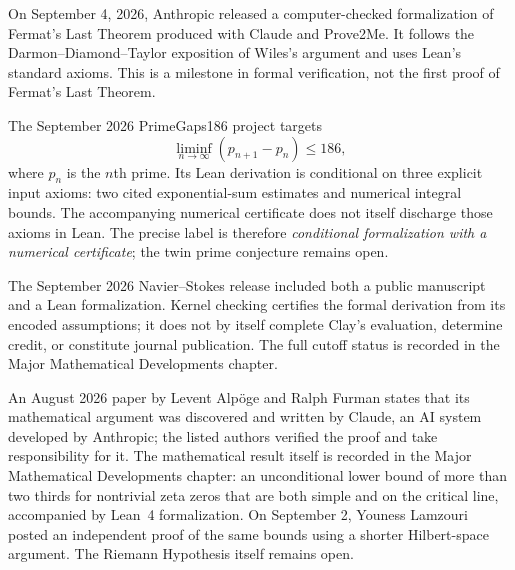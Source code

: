     \begin{fact}
        On September 4, 2026, Anthropic released a computer-checked
        formalization of Fermat's Last Theorem produced with Claude and
        Prove2Me. It follows the Darmon--Diamond--Taylor exposition of Wiles's
        argument and uses Lean's standard axioms. This is a milestone in
        formal verification, not the first proof of Fermat's Last Theorem.
    \end{fact}

    \begin{fact}
        The September 2026 PrimeGaps186 project targets
        \[
            \liminf_{n\to\infty}(p_{n+1}-p_n)\leq186,
        \]
        where $p_n$ is the $n$th prime. Its Lean derivation is conditional on
        three explicit input axioms: two cited exponential-sum estimates and
        numerical integral bounds. The accompanying numerical certificate
        does not itself discharge those axioms in Lean. The precise label is
        therefore \emph{conditional formalization with a numerical
        certificate}; the twin prime conjecture remains open.
    \end{fact}

    \begin{fact}
        The September 2026 Navier--Stokes release included both a public
        manuscript and a Lean formalization. Kernel checking certifies the
        formal derivation from its encoded assumptions; it does not by itself
        complete Clay's evaluation, determine credit, or constitute journal
        publication. The full cutoff status is recorded in the Major
        Mathematical Developments chapter.
    \end{fact}

    \begin{fact}
        An August 2026 paper by Levent Alp\"oge and Ralph Furman states that its
        mathematical argument was discovered and written by Claude, an AI system
        developed by Anthropic; the listed authors verified the proof and take
        responsibility for it. The mathematical result itself is recorded in
        the Major Mathematical Developments chapter: an unconditional lower
        bound of more than two thirds for nontrivial zeta zeros that are both
        simple and on the critical line, accompanied by Lean~4 formalization.
        On September 2, Youness Lamzouri posted an independent proof of the same
        bounds using a shorter Hilbert-space argument. The Riemann Hypothesis
        itself remains open.
    \end{fact}

